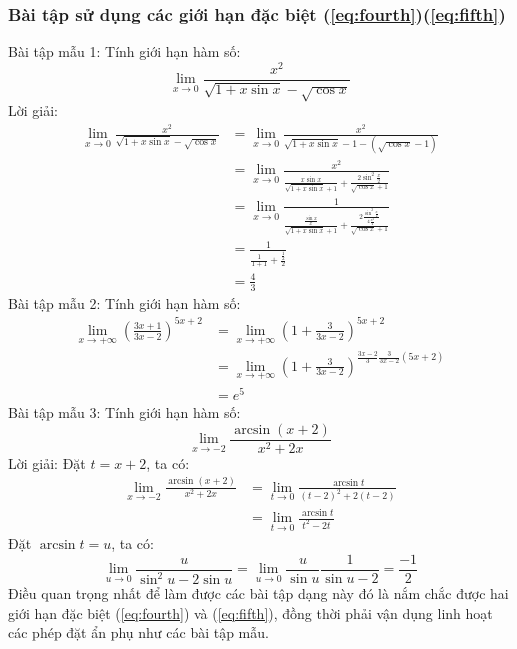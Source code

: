 \subsubsection{Bài tập sử dụng các giới hạn đặc biệt (\ref{eq:fourth})(\ref{eq:fifth})}
Bài tập mẫu 1: Tính giới hạn hàm số:$$\lim_{x\to0}\frac{x^2}{\sqrt{1+x\sin{x}}-\sqrt{\cos{x}}}$$
Lời giải:
\begin{equation*}
\begin{split}
\lim_{x\to0}\frac{x^2}{\sqrt{1+x\sin{x}}-\sqrt{\cos{x}}}&=\lim_{x\to0}\frac{x^2}{\sqrt{1+x\sin{x}}-1-(\sqrt{\cos{x}}-1)}\\&=\lim_{x\to0}\frac{x^2}{\frac{x\sin{x}}{\sqrt{1+x\sin{x}}+1}+\frac{2\sin^2{\frac{x}{2}}}{\sqrt{\cos{x}}+1}}\\&=\lim_{x\to0}\frac{1}{\frac{\frac{\sin{x}}{x}}{\sqrt{1+x\sin{x}}+1}+\frac{2\frac{\sin^2{\frac{x}{2}}}{4\frac{x^2}{4}}}{\sqrt{\cos{x}}+1}}\\&=\frac{1}{\frac{1}{1+1}+\frac{\frac{1}{2}}{2}}\\&=\frac{4}{3}
\end{split}
\end{equation*}
Bài tập mẫu 2: Tính giới hạn hàm số:
\begin{equation*}
\begin{split}
\lim_{x\to+\infty}\left(\frac{3x+1}{3x-2}\right)^{5x+2}&=\lim_{x\to+\infty}\left(1+\frac{3}{3x-2}\right)^{5x+2}\\&=\lim_{x\to+\infty}\left(1+\frac{3}{3x-2}\right)^{\frac{3x-2}{3}\frac{3}{3x-2}(5x+2)}\\&=e^5
\end{split}
\end{equation*}
Bài tập mẫu 3: Tính giới hạn hàm số:
$$\lim_{x\to-2}\frac{\arcsin{(x+2)}}{x^2+2x}$$
Lời giải: Đặt $t=x+2$, ta có:
\begin{equation*}
\begin{split}
\lim_{x\to-2}\frac{\arcsin{(x+2)}}{x^2+2x}&=\lim_{t\to0}\frac{\arcsin{t}}{(t-2)^2+2(t-2)}\\&=\lim_{t\to0}\frac{\arcsin{t}}{t^2-2t}
\end{split}
\end{equation*}
Đặt $\arcsin{t}=u$, ta có:
$$\lim_{u\to0}\frac{u}{\sin^2{u}-2\sin{u}}=\lim_{u\to0}\frac{u}{\sin{u}}\frac{1}{\sin{u}-2}=\frac{-1}{2}$$
Điều quan trọng nhất để làm được các bài tập dạng này đó là nắm chắc được hai giới hạn đặc biệt (\ref{eq:fourth}) và (\ref{eq:fifth}), đồng thời phải vận dụng linh hoạt các phép đặt ẩn phụ như các bài tập mẫu.\\
